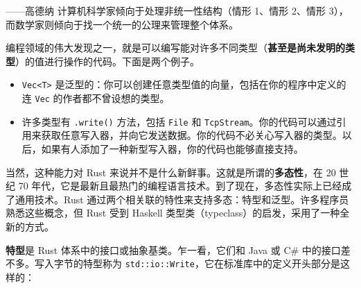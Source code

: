 
\begin{myEpigraph}{——高德纳}
计算机科学家倾向于处理非统一性结构（情形 1、情形 2、情形 3），而数学家则倾向于找一个统一的公理来管理整个体系。
\end{myEpigraph}

编程领域的伟大发现之一，就是可以编写能对许多不同类型（\textbf{甚至是尚未发明的类型}）的值进行操作的代码。下面是两个例子。

\begin{itemize}
\item \texttt{Vec<T>} 是泛型的：你可以创建任意类型值的向量，包括在你的程序中定义的连 \texttt{Vec} 的作者都不曾设想的类型。
\item 许多类型有 \texttt{.write()} 方法，包括 \texttt{File} 和 \texttt{TcpStream}。你的代码可以通过引用来获取任意写入器，并向它发送数据。你的代码不必关心写入器的类型。以后，如果有人添加了一种新型写入器，你的代码也能够直接支持。
\end{itemize}

当然，这种能力对 Rust 来说并不是什么新鲜事。这就是所谓的\textbf{多态性}，在 20 世纪 70 年代，它是最新且最热门的编程语言技术。到了现在，多态性实际上已经成了通用技术。Rust 通过两个相关联的特性来支持多态：特型和泛型。许多程序员熟悉这些概念，但 Rust 受到 Haskell 类型类（typeclass）的启发，采用了一种全新的方式。

\textbf{特型}是 Rust 体系中的接口或抽象基类。乍一看，它们和 Java 或 C\# 中的接口差不多。写入字节的特型称为 \texttt{std::io::Write}，它在标准库中的定义开头部分是这样的：

